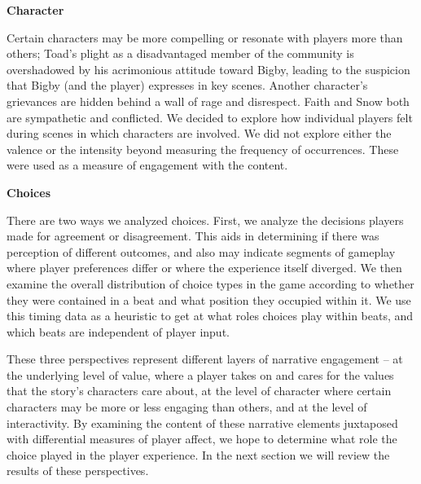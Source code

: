 \textbf{Character}

Certain characters may be more compelling or resonate with players
more than others; Toad's plight as a disadvantaged member of the
community is overshadowed by his acrimonious attitude toward Bigby,
leading to the suspicion that Bigby (and the player) expresses in key
scenes. Another character's grievances are hidden behind a wall of
rage and disrespect. Faith and Snow both are sympathetic and
conflicted. We decided to explore how individual players felt during
scenes in which characters are involved. We did not explore either the
valence or the intensity beyond measuring the frequency of
occurrences. These were used as a measure of engagement with the
content.

\textbf{Choices}

There are two ways we analyzed choices. First, we analyze the
decisions players made for agreement or disagreement. This aids in
determining if there was perception of different outcomes, and also
may indicate segments of gameplay where player preferences differ or
where the experience itself diverged.  We then examine the overall
distribution of choice types in the game according to whether they
were contained in a beat and what position they occupied within it. We
use this timing data as a heuristic to get at what roles choices play
within beats, and which beats are independent of player input.  

These three perspectives represent different layers of narrative
engagement -- at the underlying level of value, where a player takes
on and cares for the values that the story's characters care about, at
the level of character where certain characters may be more or less
engaging than others, and at the level of interactivity. By examining
the content of these narrative elements juxtaposed with differential
measures of player affect, we hope to determine what role the choice
played in the player experience. In the next section we will review
the results of these perspectives.

